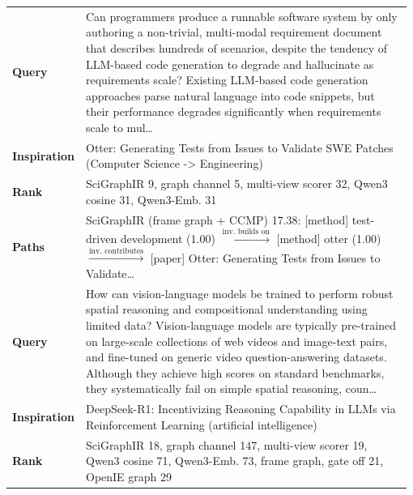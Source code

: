 \begin{table}[t]
\centering\footnotesize
\setlength{\tabcolsep}{4pt}\renewcommand{\arraystretch}{1.15}
\begin{tabular}{@{}p{0.13\linewidth} p{0.85\linewidth}@{}}
\toprule
\textbf{Query} & Can programmers produce a runnable software system by only authoring a non-trivial, multi-modal requirement document that describes hundreds of scenarios, despite the tendency of LLM-based code generation to degrade and hallucinate as requirements scale? Existing LLM-based code generation approaches parse natural language into code snippets, but their performance degrades significantly when requirements scale to mul… \\
\textbf{Inspiration} & Otter: Generating Tests from Issues to Validate SWE Patches {\scriptsize(Computer Science -> Engineering)} \\
\textbf{Rank} & {\scriptsize SciGraphIR 9, graph channel 5, multi-view scorer 32, Qwen3 cosine 31, Qwen3-Emb. 31} \\
\textbf{Paths} & {\scriptsize SciGraphIR (frame graph + CCMP)} 17.38: [method] test-driven development {\scriptsize(1.00)} $\xrightarrow{\text{inv. builds on}}$ [method] otter {\scriptsize(1.00)} $\xrightarrow{\text{inv. contributes}}$ [paper] Otter: Generating Tests from Issues to Validate… \\
\midrule
\textbf{Query} & How can vision-language models be trained to perform robust spatial reasoning and compositional understanding using limited data? Vision-language models are typically pre-trained on large-scale collections of web videos and image-text pairs, and fine-tuned on generic video question-answering datasets. Although they achieve high scores on standard benchmarks, they systematically fail on simple spatial reasoning, coun… \\
\textbf{Inspiration} & DeepSeek-R1: Incentivizing Reasoning Capability in LLMs via Reinforcement Learning {\scriptsize(artificial intelligence)} \\
\textbf{Rank} & {\scriptsize SciGraphIR 18, graph channel 147, multi-view scorer 19, Qwen3 cosine 71, Qwen3-Emb. 73, frame graph, gate off 21, OpenIE graph 29} \\

\end{tabular}
\end{table}
